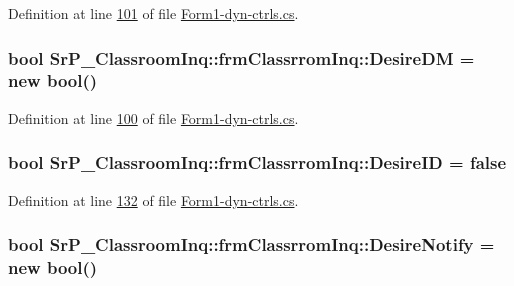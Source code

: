\-Definition at line \hyperlink{_form1-dyn-ctrls_8cs_source_l00101}{101} of file \hyperlink{_form1-dyn-ctrls_8cs_source}{\-Form1-\/dyn-\/ctrls.\-cs}.

\hypertarget{class_sr_p___classroom_inq_1_1frm_classrrom_inq_a8f8f9bb905b290fa448b445560458f89}{
\subsubsection[{\-Desire\-D\-M}]{\setlength{\rightskip}{0pt plus 5cm}bool {\bf \-Sr\-P\-\_\-\-Classroom\-Inq\-::frm\-Classrrom\-Inq\-::\-Desire\-D\-M} = new bool()}}
\label{class_sr_p___classroom_inq_1_1frm_classrrom_inq_a8f8f9bb905b290fa448b445560458f89}


\-Definition at line \hyperlink{_form1-dyn-ctrls_8cs_source_l00100}{100} of file \hyperlink{_form1-dyn-ctrls_8cs_source}{\-Form1-\/dyn-\/ctrls.\-cs}.

\hypertarget{class_sr_p___classroom_inq_1_1frm_classrrom_inq_aad36cc9a93fb79969dd3b0d0fe52b793}{
\subsubsection[{\-Desire\-I\-D}]{\setlength{\rightskip}{0pt plus 5cm}bool {\bf \-Sr\-P\-\_\-\-Classroom\-Inq\-::frm\-Classrrom\-Inq\-::\-Desire\-I\-D} = false}}
\label{class_sr_p___classroom_inq_1_1frm_classrrom_inq_aad36cc9a93fb79969dd3b0d0fe52b793}


\-Definition at line \hyperlink{_form1-dyn-ctrls_8cs_source_l00132}{132} of file \hyperlink{_form1-dyn-ctrls_8cs_source}{\-Form1-\/dyn-\/ctrls.\-cs}.

\hypertarget{class_sr_p___classroom_inq_1_1frm_classrrom_inq_a39e6b524ac1f9239b638d8c3fe0fca7e}{
\subsubsection[{\-Desire\-Notify}]{\setlength{\rightskip}{0pt plus 5cm}bool {\bf \-Sr\-P\-\_\-\-Classroom\-Inq\-::frm\-Classrrom\-Inq\-::\-Desire\-Notify} = new bool()}}
\label{class_sr_p___classroom_inq_1_1frm_classrrom_inq_a39e6b524ac1f9239b638d8c3fe0fca7e}


